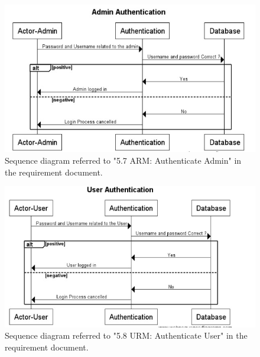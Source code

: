 \documentclass[a4paper,11pt]{article}
\begin{document}
\begin{figure}[ht!]
	\centering
	\includegraphics[width=150mm]{SequenceDiagrams/AdminAuth.jpg}
	\caption{Sequence diagram referred to "5.7 ARM: Authenticate Admin" in the requirement document. \label{6}}
\end{figure}
\begin{figure}[ht!]
	\centering
	\includegraphics[width=150mm]{SequenceDiagrams/UserAuth.jpg}
	\caption{Sequence diagram referred to "5.8 URM: Authenticate User" in the requirement document. \label{7}}
\end{figure}
\end{document}
